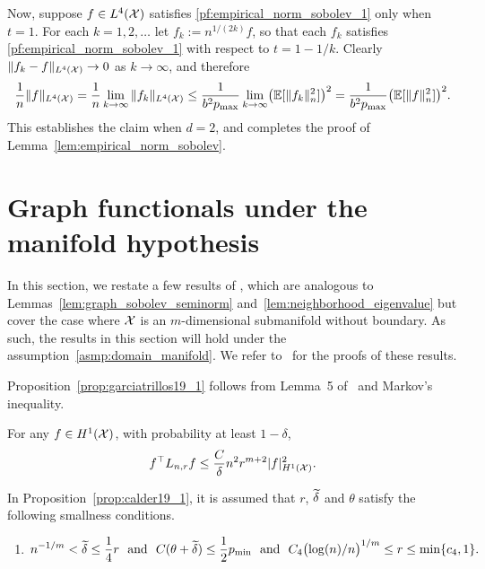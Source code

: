 Now, suppose $f \in L^4(\mathcal{X})$ satisfies \eqref{pf:empirical_norm_sobolev_1} only when $t = 1$. For each $k = 1,2,\ldots$ let $f_k := n^{1/(2k)}f$, so that each $f_k$ satisfies \eqref{pf:empirical_norm_sobolev_1} with respect to $t = 1 - 1/k$. Clearly $\|f_k - f\|_{L^4(\mathcal{X})} \to 0$ as $k \to \infty$, and therefore
\begin{equation*}
\frac{1}{n}\|f\|_{L^4(\mathcal{X})} = \frac{1}{n}\lim_{k \to \infty} \|f_k\|_{L^4(\mathcal{X})} \leq \frac{1}{b^2p_{\max}} \lim_{k \to \infty} \bigl(\mathbb{E}[\|f_k\|_n^2]\bigr)^2 =  \frac{1}{b^2p_{\max}}\bigl(\mathbb{E}[\|f\|_n^2]\bigr)^2.
\end{equation*}
This establishes the claim when $d = 2$, and completes the proof of Lemma~\ref{lem:empirical_norm_sobolev}.

\section{Graph functionals under the manifold hypothesis}
\label{sec:manifold}

In this section, we restate a few results of \citet{trillos2019,calder2019}, which are analogous to Lemmas~\ref{lem:graph_sobolev_seminorm} and~\ref{lem:neighborhood_eigenvalue} but cover the case where $\mathcal{X}$ is an $m$-dimensional submanifold without boundary. As such, the results in this section will hold under the assumption~\ref{asmp:domain_manifold}. We refer to~\citet{trillos2019,calder2019} for the proofs of these results.

Proposition~\ref{prop:garciatrillos19_1} follows from Lemma~5 of~\citet{trillos2019} and Markov's inequality.
\begin{proposition}
	\label{prop:garciatrillos19_1}
	For any $f \in H^1(\mathcal{X})$, with probability at least $1 - \delta$,
	\begin{equation*}
	f^{\top} L_{n,r} f \leq \frac{C}{\delta} n^2 r^{m + 2} |f|_{H^1(\mathcal{X})}^2.
	\end{equation*}
\end{proposition}

In Proposition~\ref{prop:calder19_1}, it is assumed that $r$, $\widetilde{\delta}$ and $\theta$ satisfy the following smallness conditions.
\begin{enumerate}[label=(S\arabic*)]
	\item 
	\setcounter{enumi}{1}
	\begin{equation*}
	n^{-1/m} < \widetilde{\delta} \leq \frac{1}{4}r~~\textrm{and}~~C(\theta + \widetilde{\delta}) \leq \frac{1}{2}p_{\min}~~\textrm{and}~~C_4\bigl(\log(n)/n\bigr)^{1/m}\leq r \leq\min\{c_4,1\}.
	\end{equation*}
\end{enumerate}

